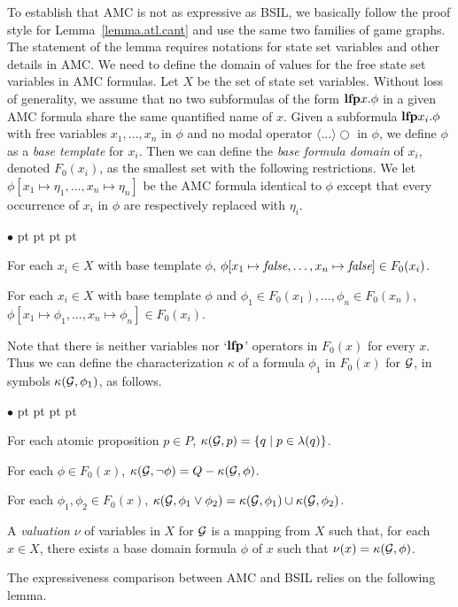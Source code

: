 \documentclass[11pt]{article}
\newcommand{\emlfp}{\mbox{\bf lfp}}
\newcommand{\calg}{{\cal G}}
\newcommand{\false}{\mbox{\em false}}
\newcommand{\nxt}{\bigcirc}
\newenvironment{list1}{\begin{list}{$\bullet$}
{\topsep 0 pt \parsep 0 pt \partopsep 0 pt \itemsep 0 pt}}{\end{list}}
\begin{document}
To establish that AMC is not as expressive as BSIL, we basically follow 
the proof style for Lemma~\ref{lemma.atl.cant} and 
use the same two families of game graphs.  
The statement of the lemma requires notations for 
state set variables and other details in AMC. 
We need to define the domain of values for the free state set variables 
in AMC formulas.  
Let $X$ be the set of state set variables.  
Without loss of generality, we assume that no two subformulas
of the form $\emlfp x.\phi$ in
a given AMC formula share the same quantified name of $x$.
Given a subformula $\emlfp x_i.\phi$
with free variables $x_1,\ldots,x_n$ in $\phi$
and no modal operator $\langle\ldots\rangle\nxt$ in $\phi$,
we define $\phi$ as a {\em base template} for $x_i$.
Then we can define the {\em base formula domain} of $x_i$,
denoted $F_0(x_i)$,
as the smallest set with the following restrictions.
We let $\phi[x_1\mapsto \eta_1,\ldots,x_n\mapsto\eta_n]$ 
be the AMC formula identical to 
$\phi$ except that every occurrence of $x_i$ in $\phi$ are respectively 
replaced with $\eta_i$.  
\begin{list1}
\item For each $x_i\in X$ with base template $\phi$,
    $\phi[x_1\mapsto\false,\ldots,x_n\mapsto\false]\in F_0(x_i)$.
\item For each $x_i\in X$ with base template $\phi$
    and $\phi_1\in F_0(x_1),\ldots,\phi_n\in F_0(x_n)$,
    $\phi[x_1\mapsto\phi_1,\ldots,x_n\mapsto\phi_n]\in F_0(x_i)$.
\end{list1}
Note that there is neither variables nor `$\emlfp$' operators
in $F_0(x)$ for every $x$.
Thus we can define the characterization $\kappa$ 
of a formula $\phi_1$ in $F_0(x)$ for $\calg$,
in symbols $\kappa(\calg,\phi_1)$, as follows.
\begin{list1}
\item For each atomic proposition $p\in P$,
    $\kappa(\calg,p)=\{q\mid p\in\lambda(q)\}$.
\item For each $\phi\in F_0(x)$, 
    $\kappa(\calg,\neg\phi)=Q-\kappa(\calg,\phi)$.
\item For each $\phi_1,\phi_2\in F_0(x)$,
    $\kappa(\calg,\phi_1\vee\phi_2)=\kappa(\calg,\phi_1)\cup\kappa(\calg,\phi_2)$.
\end{list1}
A {\em valuation} $\nu$ of variables in $X$ for $\calg$
is a mapping from
$X$ such that, for each $x\in X$, there exists a base domain formula
$\phi$ of $x$ such that $\nu(x)= \kappa(\calg,\phi)$.

The expressiveness comparison between AMC and BSIL relies on the
following lemma.
\end{document}
